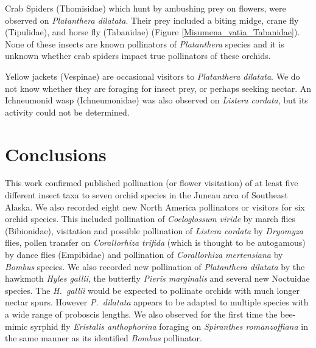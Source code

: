 \begin{multicols}{2} 













Crab Spiders (Thomisidae) which hunt by ambushing prey on flowers, were
observed on \emph{Platanthera dilatata}. Their prey included a biting
midge, crane fly (Tipulidae), and horse fly (Tabanidae) (Figure \ref{Misumena_vatia_Tabanidae}).
None of these insects are known pollinators of \emph{Platanthera}
species and it is unknown whether crab spiders impact true pollinators
of these orchids.




Yellow jackets (Vespinae) are occasional visitors to \emph{Platanthera
dilatata}. We do not know whether they are foraging for insect prey, or
perhaps seeking nectar. An Ichneumonid wasp (Ichneumonidae) was also
observed on \emph{Listera cordata}, but its activity could not be
determined.

\section{Conclusions}

This work confirmed published pollination (or flower visitation) of at
least five different insect taxa to seven orchid species in the Juneau
area of Southeast Alaska. We also recorded eight new North America
pollinators or visitors for six orchid species. This included
pollination of \emph{Coeloglossum viride} by march flies (Bibionidae),
visitation and possible pollination of \emph{Listera cordata} by
\emph{Dryomyza} flies, pollen transfer on \emph{Corallorhiza trifida} (which is thought to be autogamous) by dance flies (Empibidae) and pollination of \emph{Corallorhiza mertensiana} by \emph{Bombus} species. We also recorded new pollination of \emph{Platanthera dilatata} by the hawkmoth \emph{Hyles gallii}, the butterfly \emph{Pieris marginalis} and several
new Noctuidae species. The \emph{H.\ gallii} would be expected to
pollinate orchids with much longer nectar spurs. However \emph{P.\
dilatata} appears to be adapted to multiple species with a wide range of
proboscis lengths. We also observed for the first time the bee-mimic
syrphid fly \emph{Eristalis anthophorina} foraging on \emph{Spiranthes
romanzoffiana} in the same manner as its identified \emph{Bombus}
pollinator.


\end{multicols}
